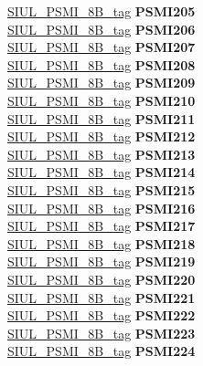 \begin{DoxyCompactItemize}
\begin{tabbing}
\>\>\mbox{\hyperlink{unionSIUL__PSMI__8B__tag}{SIUL\_PSMI\_8B\_tag}} {\bfseries PSMI205}\\
\>\>\mbox{\hyperlink{unionSIUL__PSMI__8B__tag}{SIUL\_PSMI\_8B\_tag}} {\bfseries PSMI206}\\
\>\>\mbox{\hyperlink{unionSIUL__PSMI__8B__tag}{SIUL\_PSMI\_8B\_tag}} {\bfseries PSMI207}\\
\>\>\mbox{\hyperlink{unionSIUL__PSMI__8B__tag}{SIUL\_PSMI\_8B\_tag}} {\bfseries PSMI208}\\
\>\>\mbox{\hyperlink{unionSIUL__PSMI__8B__tag}{SIUL\_PSMI\_8B\_tag}} {\bfseries PSMI209}\\
\>\>\mbox{\hyperlink{unionSIUL__PSMI__8B__tag}{SIUL\_PSMI\_8B\_tag}} {\bfseries PSMI210}\\
\>\>\mbox{\hyperlink{unionSIUL__PSMI__8B__tag}{SIUL\_PSMI\_8B\_tag}} {\bfseries PSMI211}\\
\>\>\mbox{\hyperlink{unionSIUL__PSMI__8B__tag}{SIUL\_PSMI\_8B\_tag}} {\bfseries PSMI212}\\
\>\>\mbox{\hyperlink{unionSIUL__PSMI__8B__tag}{SIUL\_PSMI\_8B\_tag}} {\bfseries PSMI213}\\
\>\>\mbox{\hyperlink{unionSIUL__PSMI__8B__tag}{SIUL\_PSMI\_8B\_tag}} {\bfseries PSMI214}\\
\>\>\mbox{\hyperlink{unionSIUL__PSMI__8B__tag}{SIUL\_PSMI\_8B\_tag}} {\bfseries PSMI215}\\
\>\>\mbox{\hyperlink{unionSIUL__PSMI__8B__tag}{SIUL\_PSMI\_8B\_tag}} {\bfseries PSMI216}\\
\>\>\mbox{\hyperlink{unionSIUL__PSMI__8B__tag}{SIUL\_PSMI\_8B\_tag}} {\bfseries PSMI217}\\
\>\>\mbox{\hyperlink{unionSIUL__PSMI__8B__tag}{SIUL\_PSMI\_8B\_tag}} {\bfseries PSMI218}\\
\>\>\mbox{\hyperlink{unionSIUL__PSMI__8B__tag}{SIUL\_PSMI\_8B\_tag}} {\bfseries PSMI219}\\
\>\>\mbox{\hyperlink{unionSIUL__PSMI__8B__tag}{SIUL\_PSMI\_8B\_tag}} {\bfseries PSMI220}\\
\>\>\mbox{\hyperlink{unionSIUL__PSMI__8B__tag}{SIUL\_PSMI\_8B\_tag}} {\bfseries PSMI221}\\
\>\>\mbox{\hyperlink{unionSIUL__PSMI__8B__tag}{SIUL\_PSMI\_8B\_tag}} {\bfseries PSMI222}\\
\>\>\mbox{\hyperlink{unionSIUL__PSMI__8B__tag}{SIUL\_PSMI\_8B\_tag}} {\bfseries PSMI223}\\
\>\>\mbox{\hyperlink{unionSIUL__PSMI__8B__tag}{SIUL\_PSMI\_8B\_tag}} {\bfseries PSMI224}\\

\end{tabbing}
\end{DoxyCompactItemize}
